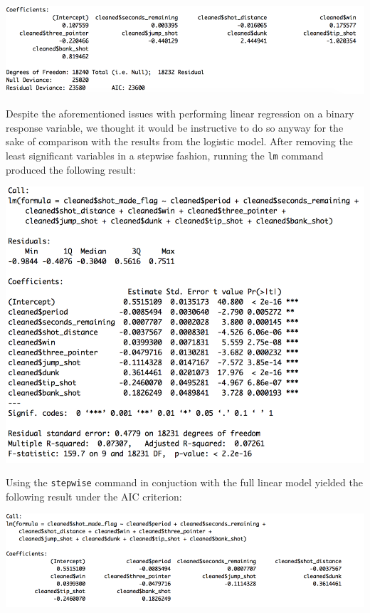 \documentclass[paper=a4, fontsize=11pt]{scrartcl} %
\numberwithin{equation}{section} %
\numberwithin{figure}{section} %
\numberwithin{table}{section} %
\begin{document}
\begin{center}
	\includegraphics[width=14cm]{img/logitbic}
\end{center}
\hspace*{1cm} Despite the aforementioned issues with performing linear regression on a binary response variable, we thought it would be instructive to do so anyway for the sake of comparison with the results from the logistic model. After removing the least significant variables in a stepwise fashion, running the \texttt{lm} command produced the following result: 
\begin{center}
	\includegraphics[width=14cm]{img/lm1}
\end{center}
\hspace*{1cm} Using the \texttt{stepwise} command in conjuction with the full linear model yielded the following result under the AIC criterion:
\begin{center}
	\includegraphics[width=14cm]{img/lmaic}
\end{center}
\end{document}
